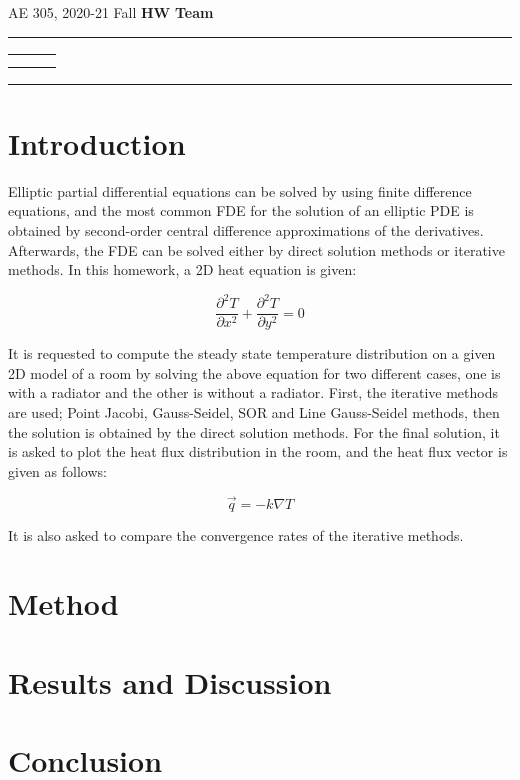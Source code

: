 \documentclass[letterpaper,12pt]{article}
\begin{document}
\begin{center}
AE 305, 2020-21 Fall \hfill \textbf{HW \HWno} \hfill \textbf{Team \TeamNo} \\
\noindent\rule{\textwidth}{0.4pt}
\begin{tabular}{p{} | p{} | p{} }
	\AuthorOneName&\AuthorTwoName&\AuthorThreeName\\
	\textit{\AuthorOneID}&\textit{\AuthorTwoID}&\textit{\AuthorThreeID}
\end{tabular}
\noindent\rule{\textwidth}{0.4pt}
\end{center}


\section{Introduction}
Elliptic partial differential equations can be solved by using finite difference equations,
and the most common FDE for the solution of an elliptic PDE is obtained by second-order
central difference approximations of the derivatives. Afterwards, the FDE can
be solved either by direct solution methods or iterative methods. In this homework, a 2D
heat equation is given:

\begin{equation}
	\frac{\partial^2T}{\partial x^2} + \frac{\partial^2T}{\partial y^2} = 0
	\label{eqn:heateqn}
\end{equation}

It is requested to compute the steady state temperature distribution on a given 2D model
of a room by solving the above equation for two different cases, one is with a radiator and
the other is without a radiator. First, the iterative methods are used; Point 
Jacobi, Gauss-Seidel, SOR and Line Gauss-Seidel methods, then the solution is obtained
by the direct solution methods. For the final solution, it is asked to plot the heat
flux distribution in the room, and the heat flux vector is given as follows:

\begin{equation}
	\vec{q} = -k \nabla T
	\label{eqn:heatflux}
\end{equation}

It is also asked to compare the convergence rates of the iterative methods.
\section{Method}
\section{Results and Discussion}
\subsection{}
\section{Conclusion}
\end{document}

